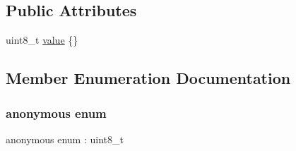 \subsection*{Public Attributes}
\begin{DoxyCompactItemize}
\item 
uint8\+\_\+t \hyperlink{structmaf__perception__interface_1_1ImageRetrievalDescriptorPropertyEnum_abc55707bc95daef073374a2ba046e130}{value} \{\}
\end{DoxyCompactItemize}


\subsection{Member Enumeration Documentation}
\mbox{\label{structmaf__perception__interface_1_1ImageRetrievalDescriptorPropertyEnum_abd10dca2cfb27ce18ee6bd3910bba303}} 
\subsubsection{\texorpdfstring{anonymous enum}{anonymous enum}}
{\footnotesize\ttfamily anonymous enum \+: uint8\+\_\+t}

